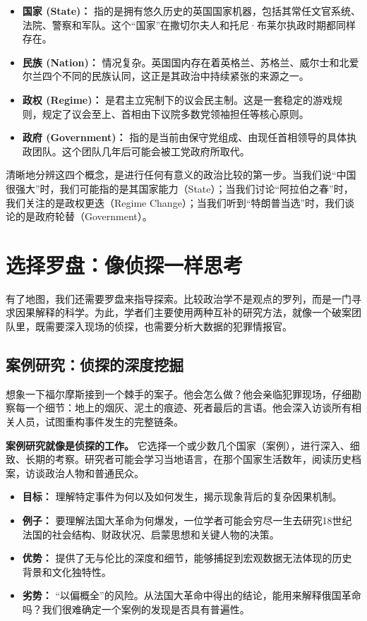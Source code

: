 \documentclass[a5paper, 11pt, openany]{ctexbook}
\begin{document}
\begin{itemize}
    \item \textbf{国家 (State)：} 指的是拥有悠久历史的英国国家机器，包括其常任文官系统、法院、警察和军队。这个“国家”在撒切尔夫人和托尼·布莱尔执政时期都同样存在。
    \item \textbf{民族 (Nation)：} 情况复杂。英国国内存在着英格兰、苏格兰、威尔士和北爱尔兰四个不同的民族认同，这正是其政治中持续紧张的来源之一。
    \item \textbf{政权 (Regime)：} 是君主立宪制下的议会民主制。这是一套稳定的游戏规则，规定了议会至上、首相由下议院多数党领袖担任等核心原则。
    \item \textbf{政府 (Government)：} 指的是当前由保守党组成、由现任首相领导的具体执政团队。这个团队几年后可能会被工党政府所取代。
\end{itemize}

清晰地分辨这四个概念，是进行任何有意义的政治比较的第一步。当我们说“中国很强大”时，我们可能指的是其国家能力（State）；当我们讨论“阿拉伯之春”时，我们关注的是政权更迭（Regime Change）；当我们听到“特朗普当选”时，我们谈论的是政府轮替（Government）。

\section{选择罗盘：像侦探一样思考}

有了地图，我们还需要罗盘来指导探索。比较政治学不是观点的罗列，而是一门寻求因果解释的科学。为此，学者们主要使用两种互补的研究方法，就像一个破案团队里，既需要深入现场的侦探，也需要分析大数据的犯罪情报官。

\subsection{案例研究：侦探的深度挖掘}

想象一下福尔摩斯接到一个棘手的案子。他会怎么做？他会亲临犯罪现场，仔细勘察每一个细节：地上的烟灰、泥土的痕迹、死者最后的言语。他会深入访谈所有相关人员，试图重构事件发生的完整链条。

\textbf{案例研究就像是侦探的工作。} 它选择一个或少数几个国家（案例），进行深入、细致、长期的考察。研究者可能会学习当地语言，在那个国家生活数年，阅读历史档案，访谈政治人物和普通民众。

\begin{itemize}
    \item \textbf{目标：} 理解特定事件为何以及如何发生，揭示现象背后的复杂因果机制。
    \item \textbf{例子：} 要理解法国大革命为何爆发，一位学者可能会穷尽一生去研究18世纪法国的社会结构、财政状况、启蒙思想和关键人物的决策。
    \item \textbf{优势：} 提供了无与伦比的深度和细节，能够捕捉到宏观数据无法体现的历史背景和文化独特性。
    \item \textbf{劣势：} “以偏概全”的风险。从法国大革命中得出的结论，能用来解释俄国革命吗？我们很难确定一个案例的发现是否具有普遍性。
\end{itemize}
\end{document}
